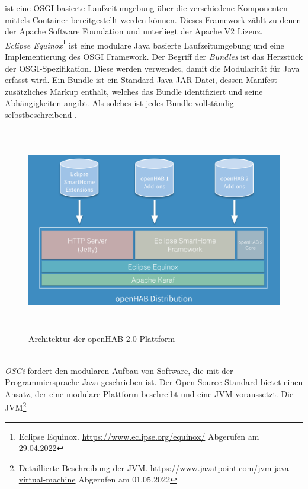     ist eine \acs{OSGI} basierte Laufzeitumgebung über die verschiedene Komponenten mittels Container 
    bereitgestellt werden können. Dieses Framework zählt zu denen der Apache Software Foundation und unterliegt der Apache V2 Lizenz.
    \\
    \linebreak
    \textit{Eclipse Equinox}\footnote{Eclipse Equinox. \url{https://www.eclipse.org/equinox/} Abgerufen am 29.04.2022} ist eine modulare 
    Java basierte Laufzeitumgebung und eine Implementierung des \acs{OSGI} Framework. Der Begriff der \textit{Bundles} ist das 
    Herzstück der \acs{OSGI}-Spezifikation. Diese werden verwendet, damit die Modularität für Java erfasst wird. Ein Bundle ist 
    ein Standard-Java-JAR-Datei, dessen Manifest zusätzliches Markup enthält, welches das Bundle identifiziert und seine Abhängigkeiten 
    angibt. Als solches ist jedes Bundle vollständig selbstbeschreibend \cite{openHAB-article}. 
    \begin{figure}[hbt!]
        \centering
        \includegraphics[width=15cm,height=9cm,keepaspectratio]{images/openhab-2-architecture.png}
        \caption{Architektur der openHAB 2.0 Plattform \cite{kaikreutzer2016}}
        \label{fig:architectureopenHAB2}
    \end{figure}
    \\
    \pagebreak
    \linebreak
    \textit{OSGi} fördert den modularen Aufbau von Software, die mit der Programmiersprache Java geschrieben ist. Der Open-Source 
    Standard bietet einen Ansatz, der eine modulare Plattform beschreibt und eine \ac{JVM} voraussetzt. Die \acl{JVM}\footnote{Detaillierte Beschreibung der JVM. \url{https://www.javatpoint.com/jvm-java-virtual-machine} Abgerufen am 01.05.2022} 
